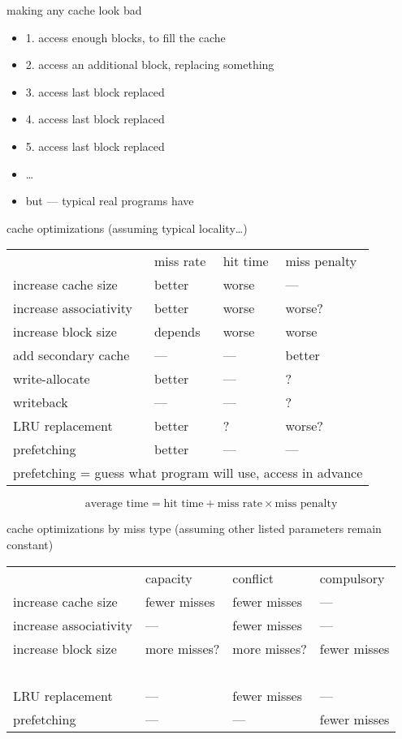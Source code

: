 \begin{frame}{making any cache look bad}
    \begin{itemize}
    \item 1. access enough blocks, to fill the cache
    \item 2. access an additional block, replacing something
    \item 3. access last block replaced
    \item 4. access last block replaced
    \item 5. access last block replaced
    \item \ldots
        \vspace{.5cm}
    \item but --- typical real programs have 
    \end{itemize}
\end{frame}

\begin{frame}{cache optimizations}
(assuming typical locality\ldots)
\newcommand{\good}{\textcolor{green!50!black}{better}}
\newcommand{\bad}{\textcolor{red!50!black}{worse}}
\begin{tabular}{llll}
~ & miss rate & hit time & miss penalty \\
increase cache size & \good & \bad & --- \\
increase associativity & \good & \bad & \bad? \\
increase block size & depends & \bad & \bad \\
add secondary cache & --- & --- & \good \\
write-allocate & \good & --- & ? \\
writeback & --- & --- & ? \\
LRU replacement & \good & ? & \bad? \\
prefetching & \good & --- & --- \\
\multicolumn{4}{l}{\small prefetching = guess what program will use, access in advance}
\end{tabular}
\[
\text{average time} = \text{hit time} + \text{miss rate} \times \text{miss penalty}
\]
\end{frame}

\begin{frame}{cache optimizations by miss type}
\newcommand{\good}{\textcolor{green!50!black}{fewer misses}}
\newcommand{\bad}{\textcolor{red!50!black}{more misses}}
(assuming other listed parameters remain constant)
\begin{tabular}{llll}
    ~ & capacity & conflict & compulsory \\
increase cache size & \good & \good & --- \\
increase associativity & --- & \good & --- \\
increase block size & \bad? & \bad? & \good \\
~ \\
LRU replacement & --- & \good & --- \\
prefetching & --- & --- & \good \\
\end{tabular}
\end{frame}

